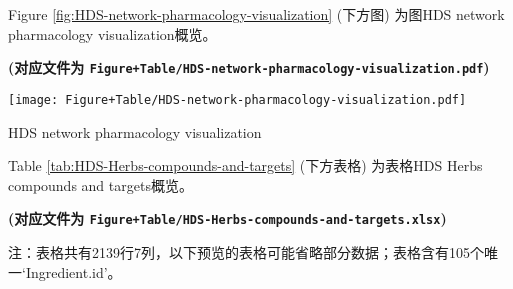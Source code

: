 \documentclass[
]{article}
\begin{document}
Figure \ref{fig:HDS-network-pharmacology-visualization} (下方图) 为图HDS network pharmacology visualization概览。

\textbf{(对应文件为 \texttt{Figure+Table/HDS-network-pharmacology-visualization.pdf})}

\def\@captype{figure}
\begin{center}
\texttt{[image: Figure+Table/HDS-network-pharmacology-visualization.pdf]}
\caption{HDS network pharmacology visualization}\label{fig:HDS-network-pharmacology-visualization}
\end{center}

Table \ref{tab:HDS-Herbs-compounds-and-targets} (下方表格) 为表格HDS Herbs compounds and targets概览。

\textbf{(对应文件为 \texttt{Figure+Table/HDS-Herbs-compounds-and-targets.xlsx})}

\begin{center}\begin{tcolorbox}[colback=gray!10, colframe=gray!50, width=0.9\linewidth, arc=1mm, boxrule=0.5pt]注：表格共有2139行7列，以下预览的表格可能省略部分数据；表格含有105个唯一`Ingredient.id'。
\end{tcolorbox}
\end{center}
\end{document}
